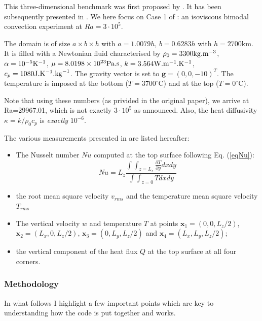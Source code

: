 
This three-dimensional benchmark was first proposed by \cite{bucc93}. 
It has been subsequently presented in \cite{tack94,trha98,albe00,omma06,dawk11,krhb12}.
We here focus on Case 1 of \cite{bucc93}:  an isoviscous bimodal convection experiment at $Ra=3\cdot 10^5$.

The domain is of size $a\times b\times h$ with $a=1.0079h$, $b=0.6283h$ with $h=2700$km. It is filled with a Newtonian fluid characterised by $\rho_0=3300{\rm kg}.{\rm m}^{-3}$, $\alpha=10^{-5}{\rm K}^{-1}$, 
$\mu=8.0198\times10^{23}{\rm Pa.s}$, 
$k=3.564{\rm W}.{\rm m}^{-1}.{\rm K}^{-1}$, 
$c_p=1080{\rm J}.{\rm K}^{-1}.{\rm kg}^{-1}$.
The gravity vector is set to ${\bm g}=(0,0,-10)^T$.
The temperature is imposed at the bottom  ($T=3700^\circ$C) and at the top ($T=0^\circ$C).

Note that using these numbers (as privided in the original paper), we arrive at Ra=29967.01, which 
is not exactly $3\cdot10^5$ as announced. Also, the heat diffusivity $\kappa=k/\rho_0 c_p$ is 
{\it exactly} $10^{-6}$.

The various measurements presented in \cite{bucc93} are listed hereafter:
\begin{itemize}
\item The Nusselt number $Nu$ computed at the top surface following Eq. (\ref{eqNu}):
\[
Nu = L_z \frac{\int\int_{z=L_z} \frac{\partial T}{\partial y} dx dy  }{\int \int_{z=0} T dx dy}
\]
\item the root mean square velocity $v_{rms}$ and the temperature mean square velocity $T_{rms}$
\item The vertical velocity $w$ and temperature $T$ at points ${\bm x}_1=(0,0,L_z/2)$, ${\bm x}_2=(L_x,0,L_z/2)$,
${\bm x}_3=(0,L_y,L_z/2)$ and ${\bm x}_4=(L_x,L_y,L_z/2)$;
\item the vertical component of the heat flux $Q$ at the top surface  at all four corners. 
\end{itemize}

\subsubsection*{Methodology}

In what follows I highlight a few important points which are key to understanding how the code
is put together and works. 

